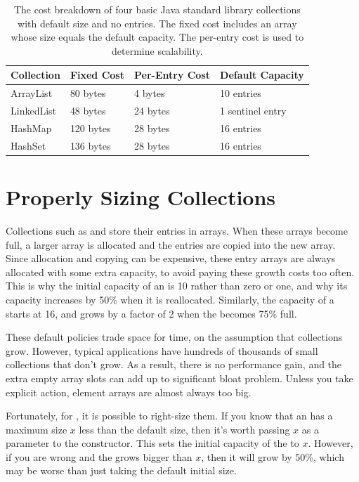 \begin{table}
  \centering
 \begin{tabular}{llll} \toprule
 	 Collection & Fixed Cost & Per-Entry Cost & Default Capacity \\ \midrule
 	ArrayList & 80 bytes & 4 bytes & 10 entries \\
 	LinkedList & 48 bytes & 24 bytes & 1 sentinel entry \\
 	HashMap & 120 bytes & 28 bytes & 16 entries \\
 	HashSet & 136 bytes & 28 bytes & 16 entries \\
 	\bottomrule
 \end{tabular}
  \caption{The cost breakdown of four basic Java standard library collections
  with default size and no entries. The fixed cost includes an array whose
   size equals the default capacity. The per-entry cost is used to
  determine scalability.}
  \label{tab:collection-costs}
\end{table} 

\section{Properly Sizing Collections}
\label{sec:proper-size}

Collections such as  and  store their entries in
arrays. When these arrays become full, a larger array is allocated
and the entries are copied into the new array.  Since allocation and copying
can be expensive, these entry arrays are always allocated with some extra
capacity, to avoid paying these growth costs too often. 
This is why the initial capacity of an  is 10 rather than zero
 or one, and why its capacity increases by
50\% when it is reallocated. 
Similarly, the capacity of a  starts at 16, and grows by a
factor of 2 when the  becomes 75\% full. 

These default policies trade space
for time, on the assumption that collections grow. However,
typical applications have hundreds of thousands of small collections that
don't grow. As a result, there is no performance gain, and the extra
empty array slots can add up to significant bloat problem. Unless you take explicit
action, element arrays are almost always too big.

 
 Fortunately, for , it is possible to right-size them. If you
 know that an  has a maximum size $x$ less than the default
 size, then it's worth passing $x$ as a parameter to the constructor. This sets the initial capacity of the
  to $x$. However, if you are wrong and the 
 grows bigger than $x$, then it will grow by 50\%, which may
 be worse than just taking the default initial size.
 

